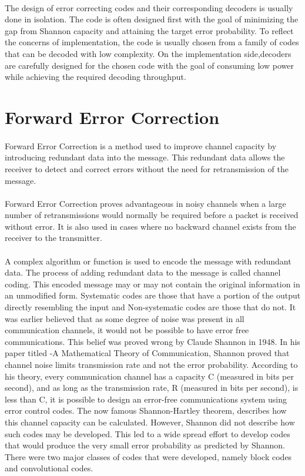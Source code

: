 \documentclass[14pt]{report}
\begin{document}
{\paragraph{} The design of error correcting codes and their corresponding decoders is usually done in isolation. The code is often designed first with the goal of minimizing the gap from Shannon capacity and attaining the target error probability. To reflect the concerns of implementation, the code is usually chosen from a family of codes that can be decoded with low complexity. On the implementation side,decoders are carefully designed for the chosen code with the goal of consuming low power while achieving the required decoding throughput.
\section{Forward Error Correction}
\paragraph{} Forward Error Correction is a method used to improve channel capacity by introducing redundant data into the message. This redundant data allows the receiver to detect and correct errors without the need for retransmission of the message.
\paragraph{} Forward Error Correction proves advantageous in noisy channels when a large number of retransmissions would normally be required before a packet is received without error. It is also used in cases where no backward channel exists from the receiver to the transmitter.
\paragraph{} A complex algorithm or function is used to encode the message with redundant data. The process of adding redundant data to the message is called channel coding. This encoded message may or may not contain the original information in an unmodified form. Systematic codes are those that have a portion of the output directly resembling the input and Non-systematic codes are those that do not. It was earlier believed that as some degree of noise was present in all communication channels, it would not be possible to have error free communications. This belief was proved wrong by Claude Shannon in 1948. In his paper titled -A Mathematical Theory of Communication, Shannon proved that channel noise limits transmission rate and not the error probability. According to his theory, every communication channel has a capacity C (measured in bits per second), and as long as the transmission rate, R (measured in bits per second), is less than C, it is possible to design an error-free communications system using error control codes. The now famous Shannon-Hartley theorem, describes how this channel capacity can be calculated. However, Shannon did not describe how such codes may be developed. This led to a wide spread effort to develop codes that would produce the very small error probability as predicted by Shannon. There were two major classes of codes that were developed, namely block codes and convolutional codes. 
}
\end{document}
